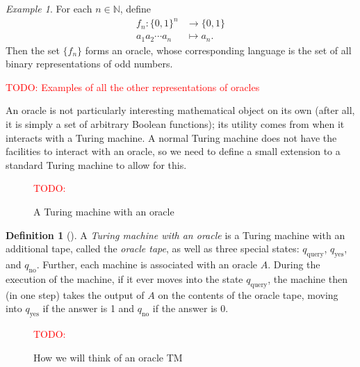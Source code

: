 \documentclass[english,12pt]{reedthesis}
\theoremstyle{plain}
\theoremstyle{definition}
\newtheorem{defn}[defn]{Definition}
\theoremstyle{remark}
\newtheorem{example}{Example}[thm]
\newcommand{\TODO}[1]{\textcolor{red}{TODO: #1}}
\begin{document}
\begin{example}\label{ex:oracle-full}
  For each $n \in \mathbb{N}$, define
  \begin{equation}
    \begin{aligned}
      f_{n}\colon \{0, 1\}^{n} &\rightarrow \{0, 1\} \\
      a_{1}a_{2} \cdots a_{n} &\mapsto a_{n}.
    \end{aligned}
  \end{equation}
  Then the set $\{f_{n}\}$ forms an oracle, whose corresponding language is the
  set of all binary representations of odd numbers.
\end{example}

\TODO{Examples of all the other representations of oracles}

An oracle is not particularly interesting mathematical object on its own (after
all, it is simply a set of arbitrary Boolean functions); its utility comes from
when it interacts with a Turing machine. A normal Turing machine does not have
the facilities to interact with an oracle, so we need to define a small
extension to a standard Turing machine to allow for this.

\begin{figure}[htbp]
  \TODO{}
  \caption{A Turing machine with an oracle}\label{fig:tm-oracle}
\end{figure}

\begin{defn}[{\cite[Def.\ 3.6]{AB09}}]\label{def:tm-oracle}
  A \emph{Turing machine with an oracle} is a Turing machine with an additional
  tape, called the \emph{oracle tape}, as well as three special states:
  $q_{\text{query}}$, $q_{\text{yes}}$, and $q_{\text{no}}$. Further, each
  machine is associated with an oracle $A$. During the execution of the machine,
  if it ever moves into the state $q_{\text{query}}$, the machine then (in one
  step) takes the output of $A$ on the contents of the oracle tape, moving into
  $q_{\text{yes}}$ if the answer is 1 and $q_{\text{no}}$ if the answer is 0.
\end{defn}

\begin{figure}[htbp]
  \TODO{}
  \caption{How we will think of an oracle TM}\label{fig:tm:concept}
\end{figure}
\end{document}

